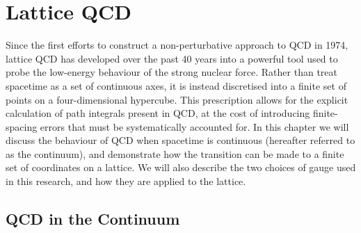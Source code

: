 
\chapter{Lattice QCD}

\ifpdf
    \graphicspath{{Chapter2/Figs/Raster/}{Chapter2/Figs/PDF/}{Chapter2/Figs/}}
\else
    \graphicspath{{Chapter2/Figs/Vector/}{Chapter2/Figs/}}
\fi
Since the first efforts to construct a non-perturbative approach to QCD in 1974\cite{Wilson:1974sk}, lattice QCD has developed over the past 40 years into a powerful tool used to probe the low-energy behaviour of the strong nuclear force. Rather than treat spacetime as a set of continuous axes, it is instead discretised into a finite set of points on a four-dimensional hypercube. This prescription allows for the explicit calculation of path integrals present in QCD, at the cost of introducing finite-spacing errors that must be systematically accounted for. In this chapter we will discuss the behaviour of QCD when spacetime is continuous (hereafter referred to as the continuum), and demonstrate how the transition can be made to a finite set of coordinates on a lattice. We will also describe the two choices of gauge used in this research, and how they are applied to the lattice. 

\section{QCD in the Continuum}
